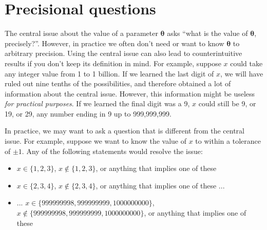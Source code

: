 \documentclass[entropy,article,accept,oneauthor,pdftex,10pt,a4paper]{mdpi}
\newcommand{\x}{\boldsymbol{\theta}}
\begin{document}



\appendix
\section{Precisional questions}

The central issue about the value of a parameter $\x$ asks
``what is the value of $\x$, precisely?''. However, in practice we often
don't need or want to know $\x$ to arbitrary precision. Using the central
issue can also lead to counterintuitive results if you don't keep its
definition in mind. For example, suppose $x$ could take any integer value
from 1 to 1 billion. If we learned the last digit of $x$, we
will have ruled out nine tenths of the possibilities, and therefore obtained
a lot of information about the central issue. However,
this information might be useless {\em for practical purposes}.
If we learned the final
digit was a 9, $x$ could still be 9, or 19, or 29, any number ending in 9
up to 999,999,999.

In practice, we may
want to ask a question that is different from the central issue.
For example, suppose we want to know the value of $x$ to within a tolerance
of $\pm 1$. Any of the following statements would resolve the issue:
\begin{itemize}
\item $x \in \{1, 2, 3\}$, $x \notin \{1, 2, 3\}$,
                or anything that implies one of these
\item $x \in \{2, 3, 4\}$, $x \notin \{2, 3, 4\}$,
                or anything that implies one of these ...
\item ... $x \in \{999999998, 999999999, 1000000000\}$,
            $x \notin \{999999998, 999999999, 1000000000\}$,
                or anything that implies one of these
\end{itemize}




%

\end{document}
